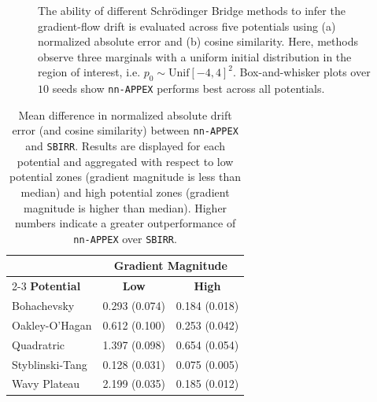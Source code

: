 \documentclass[twoside]{article}
\newcommand{\nappex}{\texttt{nn-APPEX}}
\newcommand{\sbirr}{\texttt{SBIRR}}
\begin{document}
\begin{figure}[!h]
    \caption{The ability of different Schr\"odinger Bridge methods to infer the gradient-flow drift is evaluated across five potentials using (a) normalized absolute error and (b) cosine similarity. Here, methods observe three marginals with a uniform initial distribution in the region of interest, i.e. $p_0 \sim \mathrm{Unif}[-4,4]^2$. Box-and-whisker plots over $10$ seeds show \nappex{} performs best across all potentials.}
    \label{fig:boxplots_unif}
\end{figure}


\begin{table}[!h]
    \centering
    \caption{Mean difference in normalized absolute drift error (and cosine similarity) between \nappex{} and \sbirr. Results are displayed for each potential and aggregated with respect to low potential zones (gradient magnitude is less than median) and high potential zones (gradient magnitude is higher than median). Higher numbers indicate a greater outperformance of \nappex{} over \sbirr.}
    \label{tab:gradient_magnitude}
    \begin{tabular}{lcc}
        \toprule
        & \multicolumn{2}{c}{\textbf{Gradient Magnitude}} \\
        \cmidrule(lr){2-3}
        \textbf{Potential} & \textbf{Low} & \textbf{High} \\
        \midrule
        Bohachevsky      & 0.293 (0.074) & 0.184 (0.018) \\
        Oakley-O'Hagan  & 0.612 (0.100) & 0.253 (0.042) \\
        Quadratric        & 1.397 (0.098) & 0.654 (0.054) \\
        Styblinski-Tang & 0.128 (0.031) & 0.075 (0.005) \\
        Wavy Plateau    & 2.199 (0.035) & 0.185 (0.012) \\
        \bottomrule
    \end{tabular}
\end{table}
\end{document}

